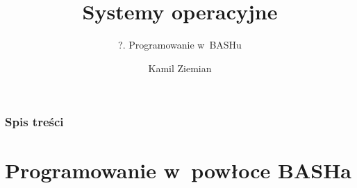 \documentclass[10pt,t]{beamer}
\title{Systemy operacyjne}
\subtitle{?. Programowanie w~BASHu}
\author{Kamil Ziemian \\
  \email}
\begin{document}





\RaggedRight





\maketitle










\begin{frame}
  \frametitle{Spis treści}


  \tableofcontents

\end{frame}










\section{Programowanie w~powłoce BASHa}
\end{document}
